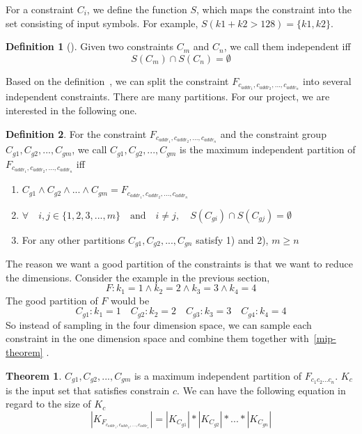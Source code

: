 For a constraint $C_i$, we define the function $S$, which maps
the constraint into the set consisting of input symbols. For example, 
$S(k1 + k2 > 128) = \{k1, k2\}$.

\theoremstyle{definition}
\newtheorem{definition}{Definition}[section]

\begin{definition}[]
      \label{independentC}
      Given two constraints $C_m$ and $C_n$, we call them independent iff 
      $$S(C_m) \cap S(C_n) = \emptyset$$
\end{definition}

Based on the definition~\label{independentC}, we can split
the constraint $F_{c_{addr_1},c_{addr_2},...,c_{addr_n}}$ into several 
independent constraints. There are many partitions. For our project, 
we are interested in the following one.

\begin{definition}
      \label{Goodpartition}
      For the constraint $F_{c_{addr_1},c_{addr_2},...,c_{addr_n}}$ and 
      the constraint group
      $C_{g1}, C_{g2}, ..., C_{gm}$, we call  $C_{g1}, C_{g2}, ..., C_{gm}$
      is the maximum independent partition of $F_{c_{addr_1},c_{addr_2},...,c_{addr_n}}$ iff
      \begin{enumerate}
            \item $C_{g1} \land C_{g2} \land ... \land C_{gm} = F_{c_{addr_1},c_{addr_2},...,c_{addr_n}}$
            \item $\forall \quad i, j \in \{1, 2, 3, ..., m\} \quad \textrm{and} \quad 
                  i \neq j, \quad S(C_{gi}) \cap S(C_{gj}) = \emptyset $
            \item For any other partitions  $C_{g1}, C_{g2}, ..., C_{gn}$ satisfy 1) and
                  2), $m \geq n$    
      \end{enumerate}
      
\end{definition}

The reason we want a good partition of the constraints is that we want to 
reduce the dimensions. Consider the example in the previous section,
$$F: {k_1} = 1\land{k_2} = 2\land{k_3} = 3\land{k_4} = 4$$
The good partition of $F$ would be
$$C_{g1}: {k_1} = 1\quad C_{g2}: {k_2} = 2\quad C_{g3}: {k_3} = 3\quad C_{g4}: {k_4} = 4$$     
So instead of sampling in the four dimension space, we can
sample each constraint in the one dimension space and combine them
together with~\ref{mip-theorem} .
\newtheorem{theorem}{Theorem}[section]
\label{mip-theorem}
\begin{theorem}
      \label{IndependentConstraint}
$C_{g1}, C_{g2}, ..., C_{gm}$ is a maximum independent partition of $F_{c_1c_2...c_n}$.
$K_c$ is the input set that satisfies constrain $c$. We can have the following
equation in regard to the size of $K_c$
$$|K_{F_{c_{addr_1},c_{addr_2},...,c_{addr_n}}}| = |K_{C_{g1}}|*|K_{C_{g2}}|*...*|K_{C_{gn}}|$$
\end{theorem}


